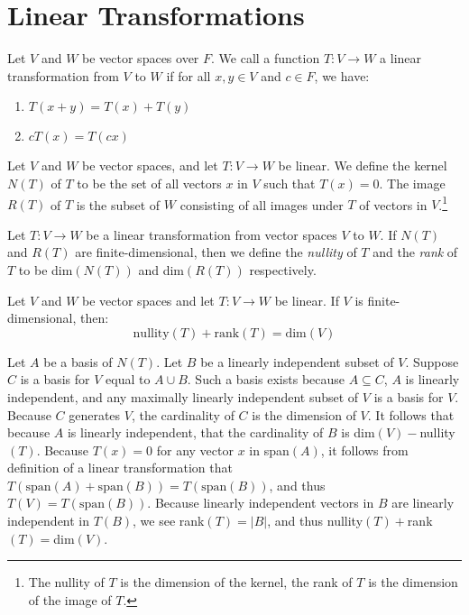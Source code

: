 \documentclass[nobib,notoc]{tufte-handout}
\begin{document}
\section{Linear Transformations}
\begin{defi}
	Let \(V\) and \(W\) be vector spaces over \(F\). We call a function \(T:V\rightarrow W\) a linear transformation from \(V\) to \(W\) if for all \(x,y\in V\) and \(c\in F\), we have:
	\begin{enumerate}
		\item \(T(x+y)=T(x)+T(y)\)
		\item \(cT(x)=T(cx)\)
	\end{enumerate}
\end{defi}
\begin{defi}
	Let \(V\) and \(W\) be vector spaces, and let \(T:V\rightarrow W\) be linear. We define the kernel \(N(T)\) of \(T\) to be the set of all vectors \(x\) in \(V\) such that \(T(x)=0\). The image \(R(T)\) of \(T\) is the subset of \(W\) consisting of all images under \(T\) of vectors in \(V\).\footnote{The nullity of \(T\) is the dimension of the kernel, the rank of \(T\) is the dimension of the image of \(T\).}
\end{defi}
\begin{defi}
	Let \(T: V\rightarrow W\) be a linear transformation from vector spaces \(V\) to \(W\). If \(N(T)\) and \(R(T)\) are finite-dimensional, then we define the \emph{nullity} of \(T\) and the \emph{rank} of \(T\) to be dim\((N(T))\) and dim\((R(T))\) respectively.
\end{defi}
\begin{thm}
	Let \(V\) and \(W\) be vector spaces and let \(T:V\rightarrow W\) be linear. If \(V\) is finite-dimensional, then:
	\begin{equation*}
		\text{nullity}(T)+\text{rank}(T)=\text{dim}(V)
	\end{equation*}
\begin{IEEEproof}
	Let \(A\) be a basis of \(N(T)\). Let \(B\) be a linearly independent subset of \(V\). Suppose \(C\) is a basis for \(V\) equal to \(A\cup B\). Such a basis exists because \(A\subseteq C\), \(A\) is linearly independent, and any maximally linearly independent subset of \(V\) is a basis for \(V\). Because \(C\) generates \(V\), the cardinality of \(C\) is the dimension of \(V\). It follows that because \(A\) is linearly independent, that the cardinality of \(B\) is dim\((V)-\)nullity\((T)\). Because \(T(x)=0\) for any vector \(x\) in span\((A)\), it follows from definition of a linear transformation that \(T(\text{span}(A)+\text{span}(B))=T(\text{span}(B))\), and thus \(T(V)=T(\text{span}(B))\). Because linearly independent vectors in \(B\) are linearly independent in \(T(B)\), we see rank\((T)=\lvert B\rvert\), and thus nullity\((T)+\)rank\((T)=\)dim\((V)\).
\end{IEEEproof}
\end{thm}
\end{document}
